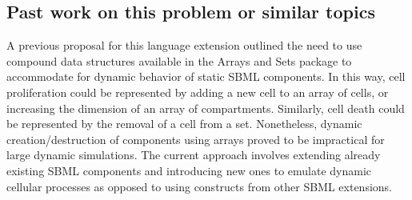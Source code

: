 \subsection{ Past work on this problem or similar topics }
\label{subsec:pastWork}

A previous proposal for this language extension outlined the need to use compound data structures available in the Arrays and Sets package to accommodate for dynamic behavior of static SBML components. In this way, cell proliferation could be represented by adding a new cell to an array of cells, or increasing the dimension of an array of compartments. Similarly, cell death could be represented by the removal of a cell from a set. Nonetheless, dynamic creation/destruction of components using arrays proved to be impractical for large dynamic simulations. The current approach involves extending already existing SBML components and introducing new ones to emulate dynamic cellular processes as opposed to using constructs from other SBML extensions.
		

